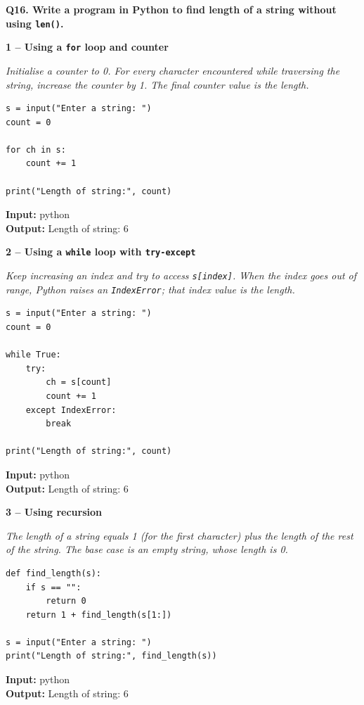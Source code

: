 \documentclass[12pt]{article}
\newenvironment{qbox}[1]{\par\bigskip\noindent\textbf{#1}\par}{\par\medskip}
\newcommand{\1}{Question}
\newcommand{\method}[1]{\par\medskip\noindent\textbf{#1}\par}
\newcommand{\logicbox}[1]{\par\smallskip\noindent\textit{#1}\par}
\newcommand{\inout}[2]{\par\smallskip\noindent\textbf{Input:} #1\\\textbf{Output:} #2\par}
\begin{document}
\begin{qbox}{Q16. Write a program in Python to find length of a string without using \texttt{len()}.}

\method{1 -- Using a \texttt{for} loop and counter}
\logicbox{Initialise a counter to 0. For every character encountered while traversing the string, increase the counter by 1. The final counter value is the length.}
\begin{lstlisting}
s = input("Enter a string: ")
count = 0

for ch in s:
    count += 1

print("Length of string:", count)
\end{lstlisting}
\inout{python}{Length of string: 6}

\method{2 -- Using a \texttt{while} loop with \texttt{try-except}}
\logicbox{Keep increasing an index and try to access \texttt{s[index]}. When the index goes out of range, Python raises an \texttt{IndexError}; that index value is the length.}
\begin{lstlisting}
s = input("Enter a string: ")
count = 0

while True:
    try:
        ch = s[count]
        count += 1
    except IndexError:
        break

print("Length of string:", count)
\end{lstlisting}
\inout{python}{Length of string: 6}

\method{3 -- Using recursion}
\logicbox{The length of a string equals 1 (for the first character) plus the length of the rest of the string. The base case is an empty string, whose length is 0.}
\begin{lstlisting}
def find_length(s):
    if s == "":
        return 0
    return 1 + find_length(s[1:])

s = input("Enter a string: ")
print("Length of string:", find_length(s))
\end{lstlisting}
\inout{python}{Length of string: 6}
\end{qbox}
\end{document}
